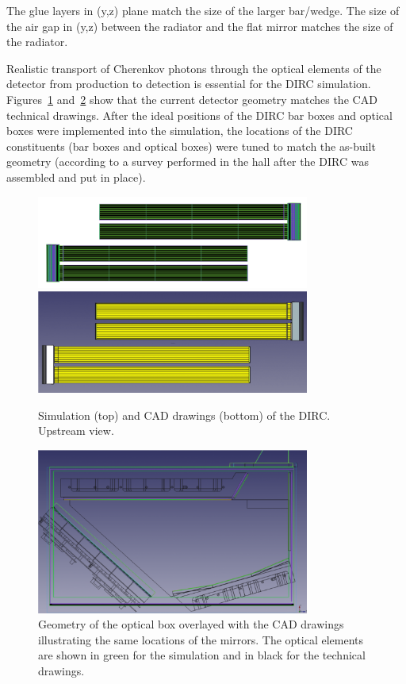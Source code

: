 The glue layers in (y,z) plane match the size of the larger bar/wedge. The size of the air gap in (y,z) between the radiator and the flat mirror matches the size of the radiator.

Realistic transport of Cherenkov photons through the optical elements of the detector from production to detection is essential for the DIRC simulation. Figures~\ref{pic:dirc} and~\ref{pic:obg} show that the current detector geometry matches the CAD technical drawings. After the ideal positions of the DIRC bar boxes and optical boxes were implemented into the simulation, the locations of the DIRC constituents (bar boxes and optical boxes) were tuned to match the as-built geometry (according to a survey performed in the hall after the DIRC was assembled and put in place).

\begin{figure}[!h]
\centering
\includegraphics[width=0.8\textwidth]{pics/bars1.png}\\
\includegraphics[width=0.8\textwidth]{pics/bars2.png}
\caption{\label{pic:dirc}
Simulation (top) and CAD drawings (bottom) of the \gluex DIRC. Upstream view.
}
\end{figure} 

\begin{figure}[!h]
\centering
\includegraphics[width=0.8\textwidth]{pics/obgeom.png}
\caption{\label{pic:obg}
Geometry of the optical box overlayed with the CAD drawings illustrating the same locations of the mirrors. The optical elements are shown in green for the simulation and in black for the technical drawings.
}
\end{figure}

